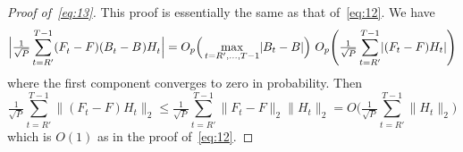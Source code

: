 \documentclass[12pt,fleqn]{article}
\begin{document}
\begin{proof}[Proof of~\eqref{eq:13}]
This proof is essentially the same as that of~\eqref{eq:12}. We have
\begin{equation*}
  \Big\lvert \tfrac{1}{\sqrt{P}} \sum_{t=R'}^{T-1} (F_t^{} - F) (B_t^{} - B^{}) H_t^{} \Big\rvert =
  O_p\Big(\max_{t=R',\dots,T-1} \lvert B_t - B\rvert\Big)\
  O_p\Bigg(\tfrac{1}{\sqrt{P}} \sum_{t=R'}^{T-1} \lvert (F_t - F) H_t \rvert \Bigg)
\end{equation*}
where the first component converges to zero in probability. Then
\begin{equation*}
  \tfrac{1}{\sqrt{P}} \sum_{t=R'}^{T-1} \lVert (F_t - F) H_t \rVert_2
  \leq \tfrac{1}{\sqrt{P}} \sum_{t=R'}^{T-1} \lVert F_t - F \rVert_2 \lVert  H_t \rVert_2
  = O\Bigg(\tfrac{1}{\sqrt{P}} \sum_{t=R'}^{T-1} \lVert  H_t \rVert_2 \Bigg)
\end{equation*}
which is $O(1)$ as in the proof of~\eqref{eq:12}.
\end{proof}

\setcounter{secnumdepth}{1}

\end{document}
